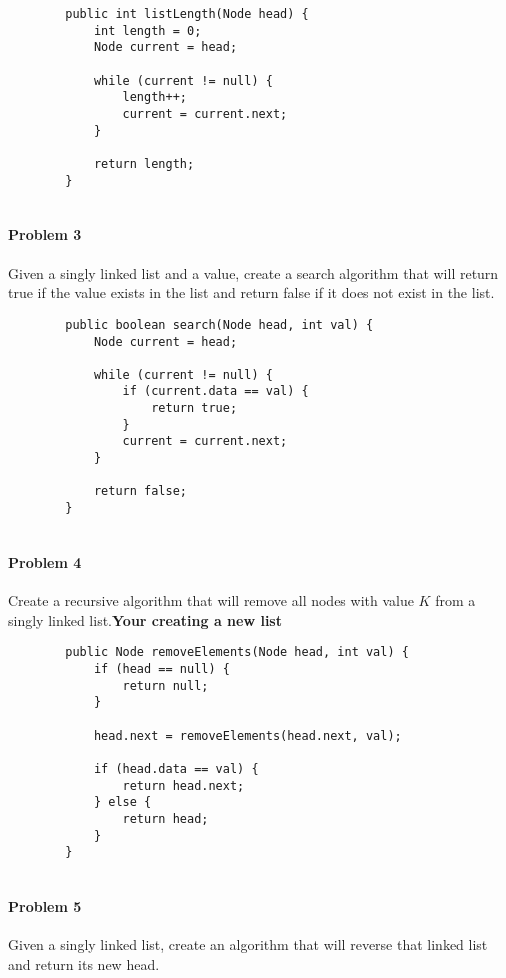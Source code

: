 \documentclass[letterpaper]{article}
\begin{document}
	\begin{verbatim}
        public int listLength(Node head) {
            int length = 0;
            Node current = head;
            
            while (current != null) {
                length++;           
                current = current.next; 
            }
            
            return length;
        }
		
	\end{verbatim}
	
	\paragraph{Problem 3} Given a singly linked list and a value, create a search algorithm that will return true if the value exists in the list and return false if it does not exist in the list.
	
	\begin{verbatim}
        public boolean search(Node head, int val) {
            Node current = head;
            
            while (current != null) {
                if (current.data == val) {
                    return true;  
                }
                current = current.next;
            }
            
            return false;  
        }
		
	\end{verbatim} 
	
	\paragraph{Problem 4} Create a recursive algorithm that will remove all nodes with value $K$ from a singly linked list.\textbf{Your creating a new list}
	
	\begin{verbatim}
        public Node removeElements(Node head, int val) {
            if (head == null) {
                return null; 
            }
            
            head.next = removeElements(head.next, val);
            
            if (head.data == val) {
                return head.next; 
            } else {
                return head;      
            }
        }
		
	\end{verbatim}
	
	\paragraph{Problem 5} Given a singly linked list, create an algorithm that will reverse that linked list and return its new head.
	
\end{document}
